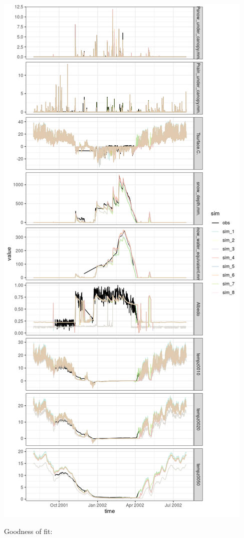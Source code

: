 \documentclass[
]{article}
\begin{document}
\includegraphics{coldelaporte_v6_files/figure-latex/Winter_2001_2002-1.png}

Goodness of fit:
\end{document}
